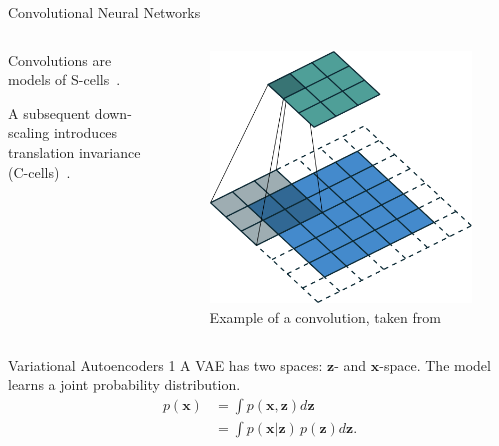 \documentclass{beamer}
\begin{document}
    \begin{frame}{Convolutional Neural Networks}
        \begin{columns}
            \begin{column}{0.48\textwidth}
                Convolutions are models of S-cells~\cite{lindsay2020convolutional}.

                A subsequent down-scaling introduces translation invariance (C-cells)~\cite{lindsay2020convolutional}.
            \end{column}
            \begin{column}{0.48\textwidth}
                \begin{figure}
                    \centering
                    \includegraphics[width=\textwidth]{pres_imgs/convolution_example.png}
                    \caption{Example of a convolution, taken from \cite{dumoulin2016guide}}
                    \label{fig:example_convolution}
                \end{figure}
            \end{column}
        \end{columns}
    \end{frame}
    \begin{frame}{Variational Autoencoders 1}
        A VAE has two spaces: $\bm{z}$- and $\bm{x}$-space.
        The model learns a joint probability distribution.
        \begin{align*}
            p(\bm{x}) &= \int p(\bm{x}, \bm{z})d\bm{z}\\
            &= \int p(\bm{x}|\bm{z})\,p(\bm{z})d\bm{z}.
        \end{align*}
    \end{frame}
\end{document}
